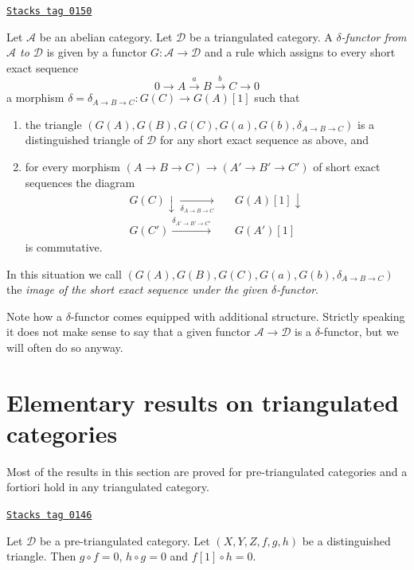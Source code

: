 \begin{definition}
\label{derived-definition-delta-functor}
\href{https://stacks.math.columbia.edu/tag/0150}{\texttt{Stacks tag 0150}}

Let $\mathcal{A}$ be an abelian category.
Let $\mathcal{D}$ be a triangulated category.
A {\it $\delta$-functor from $\mathcal{A}$ to $\mathcal{D}$} is
given by a functor $G : \mathcal{A} \to \mathcal{D}$ and
a rule which assigns to every short exact sequence
$$
0 \to A \xrightarrow{a} B \xrightarrow{b} C \to 0
$$
a morphism $\delta = \delta_{A \to B \to C} : G(C) \to G(A)[1]$
such that
\begin{enumerate}
\item the triangle
$(G(A), G(B), G(C), G(a), G(b), \delta_{A \to B \to C})$
is a distinguished triangle of $\mathcal{D}$
for any short exact sequence as above, and
\item for every morphism $(A \to B \to C) \to (A' \to B' \to C')$
of short exact sequences the diagram
$$
\begin{array}{ccc}G(C) \downarrow\underset{\delta_{A \to B \to C}}{\longrightarrow} &  & G(A)[1] \downarrow \\ G(C') \overset{\delta_{A' \to B' \to C'}}{\longrightarrow} &  & G(A')[1]\end{array}
$$
is commutative.
\end{enumerate}
In this situation we call
$(G(A), G(B), G(C), G(a), G(b), \delta_{A \to B \to C})$
the {\it image of the short exact sequence under the
given $\delta$-functor}.
\end{definition}

Note how a $\delta$-functor comes equipped with additional structure.
Strictly speaking it does not make sense to say that a given
functor $\mathcal{A} \to \mathcal{D}$ is a $\delta$-functor, but we
will often do so anyway.

\section{Elementary results on triangulated categories}
\label{derived-section-elementary-results}
Most of the results in this section are proved for pre-triangulated categories
and a fortiori hold in any triangulated category.

\begin{lemma}
\label{derived-lemma-composition-zero}
\href{https://stacks.math.columbia.edu/tag/0146}{\texttt{Stacks tag 0146}}

Let $\mathcal{D}$ be a pre-triangulated category.
Let $(X, Y, Z, f, g, h)$ be a distinguished triangle.
Then $g \circ f = 0$,
$h \circ g = 0$ and $f[1] \circ h = 0$.
\end{lemma}

